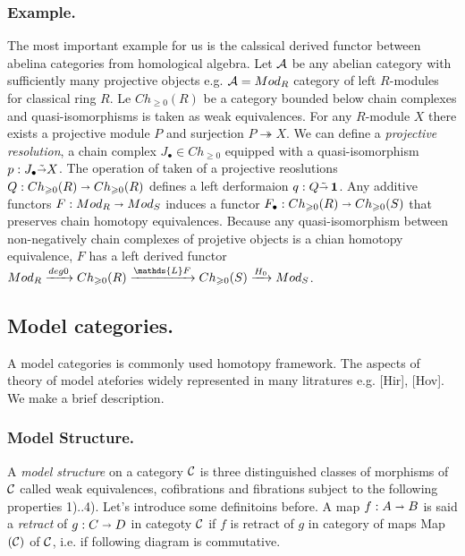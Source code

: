        \subsubsection{Example.} The most important example for us is the calssical derived functor between abelina categories from
       homological algebra.
       \newline
       \newline
       Let $\mathcal{A}$ be any abelian category with sufficiently many projective objects e.g. $ \mathcal{A} = Mod_{R}$ category of left $R$-modules for classical ring $R$. Le $ Ch_{\geqslant 0}(R) $ be a category bounded below chain complexes and quasi-isomorphisms is taken as weak equivalences. For any $R$-module $X$ there exists a projective module $P$ and 
       surjection $ P \twoheadrightarrow X $. We can define a \textit{projective resolution}, a chain complex $J_{\bullet} \in Ch_{\geqslant 0}$ equipped with a quasi-isomorphism $p : J_{\bullet} \tilde{\shortrightarrow} X$. The operation of taken of a projective reoslutions $ Q : Ch_{\geqslant 0}(R) \shortrightarrow Ch_{\geqslant 0}(R) $ defines a left derformaion $ q : Q \tilde{\shortrightarrow} \operatorname*{\textbf{1}} $. Any additive functors $ F : Mod_{R} \shortrightarrow Mod_{S} $ induces a functor
       $ F_{\bullet} : Ch_{\geqslant 0}(R) \shortrightarrow Ch_{\geqslant 0}(S) $ that preserves chain homotopy equivalences. Because
       any quasi-isomorphism between non-negatively chain complexes of projetive objects is a chian homotopy equivalence, $ F $ has a
       left derived functor
       $ Mod_{R} \xrarr[]{deg0} Ch_{\geqslant 0}(R) \xrarr[]{\mathds{L} F} Ch_{\geqslant 0}(S) \xrarr[]{H_{0}} Mod_{S} $.     	
	
	\subsection{Model categories.}
	 A model categories is commonly used homotopy framework. The aspects of theory of model atefories widely represented in
     many litratures e.g. [Hir], [Hov]. We make a brief description.
	 \subsubsection{Model Structure.}
	 A \textit{model structure} on a category $\mathcal{C}$ is three distinguished classes of morphisms of $\mathcal{C}$ 
	 called weak equivalences, cofibrations and fibrations subject to the following properties 1)..4).
	 \newline
	 \newline
	 Let's introduce some definitoins before. A map $ f : A \shortrightarrow B $ is said a \textit{retract} of $ g : C \shortrightarrow D$ in categoty $\mathcal{C}$ if $f$ is retract of $g$ in category of maps Map$(\mathcal{C})$ of $\mathcal{C}$, i.e. if following diagram is commutative.
	 
